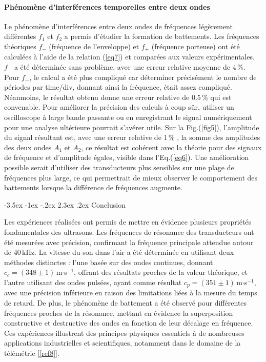 \documentclass[a4paper, 12pt,oneside]{article}
\makeatletter
\renewcommand{\section}{\@startsection {section}{1}{\z@}%
             {-3.5ex \@plus -1ex \@minus -.2ex}%
             {2.3ex \@plus.2ex}%
             {\normalfont\normalsize\bfseries}}
\makeatother
\begin{document}
\paragraph{Phénomène d’interférences temporelles entre deux ondes}

Le phénomène d’interférences entre deux ondes de fréquences légèrement différentes $f_1$ et $f_2$ a permis d’étudier la formation de battements. Les fréquences théoriques $f_-$ (fréquence de l’enveloppe) et $f_+$ (fréquence porteuse) ont été calculées à l’aide de la relation (\ref{eq7}) et comparées aux valeurs expérimentales. $f_-$ a été déterminée sans problème, avec une erreur relative moyenne de 4\,\%. Pour $f_-$, le calcul a été plus compliqué car déterminer précisément le nombre de périodes par time/div, donnant ainsi la fréquence, était assez compliqué. Néanmoins, le résultat obtenu donne une erreur relative de 0.5\,\% qui est convenable. Pour améliorer la précision des calculs à coup sûr, utiliser un oscilloscope à large bande passante ou en enregistrant le signal numériquement pour une analyse ultérieure pourrait s'avérer utile. Sur la Fig.(\ref{fig5}), l'amplitude du signal résultant est, avec une erreur relative de 1\,\% , la somme des amplitudes des deux ondes $A_1$ et $A_2$, ce résultat est cohérent avec la théorie pour des signaux de fréquence et d'amplitude égales, visible dans l'Eq.(\ref{eq6}).
Une amélioration possible serait d’utiliser des transducteurs plus sensibles sur une plage de fréquences plus large, ce qui permettrait de mieux observer le comportement des battements lorsque la différence de fréquences augmente.


\section{Conclusion}

Les expériences réalisées ont permis de mettre en évidence plusieurs propriétés fondamentales des ultrasons. Les fréquences de résonance des transducteurs ont été mesurées avec précision, confirmant la fréquence principale attendue autour de 40\,kHz. La vitesse du son dans l’air a été déterminée en utilisant deux méthodes distinctes : l’une basée sur des ondes continues, donnant $c_c=(348\pm1)$\,m$\cdot$s$^{-1}$, offrant des résultats proches de la valeur théorique, et l’autre utilisant des ondes pulsées, ayant comme résultat $c_p=(351\pm1)$\,m$\cdot$s$^{-1}$, avec une précision inférieure en raison des limitations liées à la mesure du temps de retard. De plus, le phénomène de battement a été observé pour différentes fréquences proches de la résonance, mettant en évidence la superposition constructive et destructive des ondes en fonction de leur décalage en fréquence. Ces expériences illustrent des principes physiques essentiels à de nombreuses applications industrielles et scientifiques, notamment dans le domaine de la télémétrie [\ref{ref8}].
\end{document}
